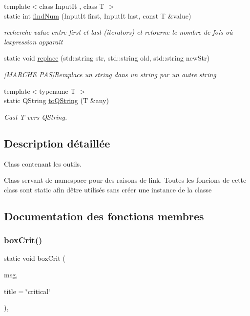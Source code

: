 \begin{DoxyCompactItemize}
{\footnotesize template$<$class Input\+It , class T $>$ }\\static int \hyperlink{classutils_a8eff63d3e19d4e7c3f4a862aa639621e}{find\+Num} (Input\+It first, Input\+It last, const T \&value)
\begin{DoxyCompactList}\small\item\em recherche value entre first et last (iterators) et retourne le nombre de fois où l\textquotesingle{}expression apparaît \end{DoxyCompactList}\item 
static void \hyperlink{classutils_ad0d97a4388f6ee0cb9557fe1302bddd4}{replace} (std\+::string str, std\+::string old, std\+::string new\+Str)
\begin{DoxyCompactList}\small\item\em \mbox{[}M\+A\+R\+C\+HE P\+AS\mbox{]}Remplace un string dans un string par un autre string \end{DoxyCompactList}\item 
\mbox{\label{classutils_a54ec377b204f138096b115fad3bb22b1}} 
{\footnotesize template$<$typename T $>$ }\\static Q\+String \hyperlink{classutils_a54ec377b204f138096b115fad3bb22b1}{to\+Q\+String} (T \&any)
\begin{DoxyCompactList}\small\item\em Cast T vers Q\+String. \end{DoxyCompactList}\end{DoxyCompactItemize}


\subsection{Description détaillée}
Class contenant les outils. 

Class servant de namespace pour des raisons de link. Toutes les foncions de cette class sont static afin d\textquotesingle{}être utilisés sans créer une instance de la classe 

\subsection{Documentation des fonctions membres}
\mbox{\label{classutils_a75e4c12b24b35e930fe42d654e8f5d7a}} 
\subsubsection{\texorpdfstring{box\+Crit()}{boxCrit()}}
{\footnotesize\ttfamily static void box\+Crit (\begin{DoxyParamCaption}\item[{Q\+String}]{msg,  }\item[{Q\+String}]{title = {\ttfamily \char`\"{}critical\char`\"{}} }\end{DoxyParamCaption})\hspace{0.3cm}{\ttfamily [inline]}, {\ttfamily [static]}}



